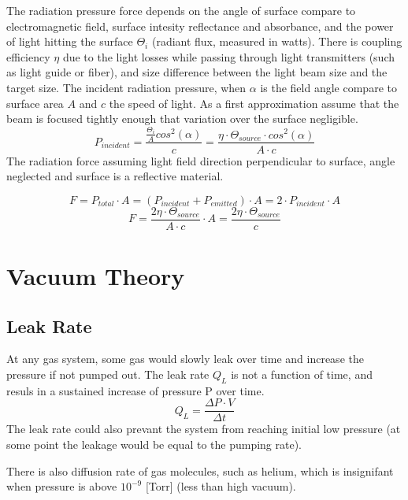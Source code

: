 \documentclass[\main/master.tex]{subfiles}
\begin{document}
\par
The radiation pressure force depends on the angle of surface compare to electromagnetic field, surface intesity reflectance and absorbance, and the power of light hitting the surface $\Theta_i$ (radiant flux, measured in watts). There is coupling efficiency $\eta$ due to the light losses while passing through light transmitters (such as light guide or fiber), and size difference between the light beam size and the target size. The incident radiation pressure, when $\alpha$ is the field angle compare to surface area $A$ and $c$ the speed of light. As a first approximation assume that the beam is focused tightly enough that variation over the surface negligible. 
\begin{equation}
P_{incident} = \frac{\frac{\Theta_i}{A}cos^2(\alpha)}{c} = \frac{\eta\cdot \Theta_{source}\cdot cos^2(\alpha)}{{A\cdot c}} \label{eqn:energy-mass-equivalence-relation}
\end{equation}
The radiation force assuming light field direction perpendicular to surface, angle neglected and surface is a reflective material.

\begin{equation}
F = P_{total}\cdot A = (P_{incident}+P_{emitted})\cdot A = 2\cdot P_{incident}\cdot A\label{eqn:energy-mass-equivalence-relation}
\end{equation}
\begin{equation}
F = \frac{2\eta\cdot\Theta_{source}}{{A\cdot c}}\cdot A = \frac{2\eta\cdot\Theta_{source}}{{c}} \label{eqn:energy-mass-equivalence-relation}
\end{equation}




 

\section{Vacuum Theory}

\subsection{Leak Rate}
At any gas system, some gas would slowly leak over time and increase the pressure if not pumped out. The leak rate $Q_L$ is not a function of time, and resuls in a sustained increase of pressure P over time.
\begin{equation}
Q_L = \frac{\Delta P\cdot V}{\Delta t}  \label{eqn:energy-mass-equivalence-relation}
\end{equation}
The leak rate could also prevant the system from reaching initial low pressure (at some point the leakage would be equal to the pumping rate).
\par
There is also diffusion rate of gas molecules, such as helium, which is insignifant when pressure is above $10^{-9}$ [Torr] (less than high vacuum). 
\end{document}
